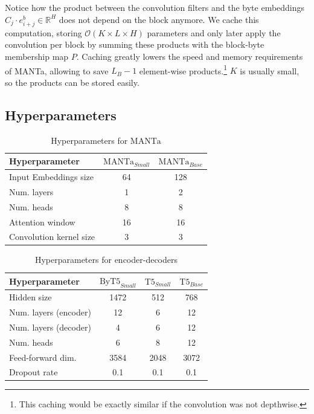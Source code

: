 Notice how the product between the convolution filters and the byte embeddings $C_j \cdot e^b_{i+j}\in\mathbb{R}^H$ does not depend on the block anymore. We cache this computation, storing $\mathcal{O}(K\times L\times H)$ parameters and only later apply the convolution per block by summing these products with the block-byte membership map $P$. Caching greatly lowers the speed and memory requirements of MANTa, allowing to save $L_B-1$ element-wise products.\footnote{This caching would be exactly similar if the convolution was not depthwise.} $K$ is usually small, so the products can be stored easily.

\subsection{Hyperparameters}
\label{sec:appendix_hp}
\begin{table}[H]
\centering\small
\begin{tabular}{lcc}
\toprule
Hyperparameter                                   & $\text{MANTa}_{Small}$  & $\text{MANTa}_{Base}$ \\ \midrule
Input Embeddings size          & 64 & 128         \\
Num. layers  & 1 & 2        \\
Num. heads  & 8 & 8        \\
Attention window & 16 & 16        \\
Convolution kernel size & 3 & 3        \\ \bottomrule
\end{tabular}
\caption{Hyperparameters for $\text{MANTa}$}
\label{tab:hp_fp}
\end{table}

\begin{table}[H]
\centering\small
\begin{tabular}{lccc}
\toprule
Hyperparameter                                   & $\text{ByT5}_{Small}$  & $\text{T5}_{Small}$ & $\text{T5}_{Base}$ \\ \midrule
Hidden size          & 1472 & 512 & 768         \\
Num. layers (encoder)  & 12 & 6 & 12       \\
Num. layers (decoder)  & 4 & 6 & 12     \\
Num. heads  & 6 & 8 & 12      \\
Feed-forward dim. & 3584 & 2048 & 3072        \\
Dropout rate & 0.1 & 0.1 & 0.1      \\ \bottomrule
\end{tabular}
\caption{Hyperparameters for encoder-decoders}
\label{tab:hp_t5}
\end{table}

